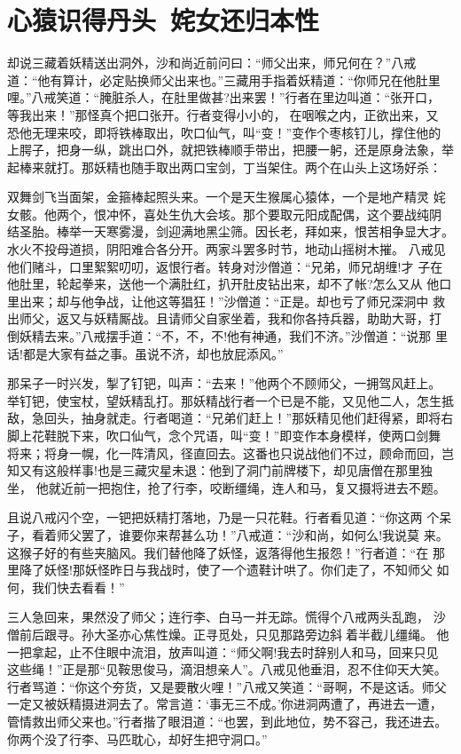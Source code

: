 \chapter{心猿识得丹头~姹女还归本性}

却说三藏着妖精送出洞外，沙和尚近前问曰：“师父出来，师兄何在？”八戒
道：“他有算计，必定贴换师父出来也。”三藏用手指着妖精道：“你师兄在他肚里
哩。”八戒笑道：“腌脏杀人，在肚里做甚?出来罢！”行者在里边叫道：“张开口，
等我出来！”那怪真个把口张开。行者变得小小的，在咽喉之内，正欲出来，又
恐他无理来咬，即将铁棒取出，吹口仙气，叫“变！”变作个枣核钉儿，撑住他的
上腭子，把身一纵，跳出口外，就把铁棒顺手带出，把腰一躬，还是原身法象，举
起棒来就打。那妖精也随手取出两口宝剑，丁当架住。两个在山头上这场好杀：

双舞剑飞当面架，金箍棒起照头来。一个是天生猴属心猿体，一个是地产精灵
姹女骸。他两个，恨冲怀，喜处生仇大会垓。那个要取元阳成配偶，这个要战纯阴
结圣胎。棒举一天寒雾漫，剑迎满地黑尘筛。因长老，拜如来，恨苦相争显大才。
水火不投母道损，阴阳难合各分开。两家斗罢多时节，地动山摇树木摧。
八戒见他们赌斗，口里絮絮叨叨，返恨行者。转身对沙僧道：“兄弟，师兄胡缠!才
子在他肚里，轮起拳来，送他一个满肚红，扒开肚皮钻出来，却不了帐?怎么又从
他口里出来；却与他争战，让他这等猖狂！”沙僧道：“正是。却也亏了师兄深洞中
救出师父，返又与妖精厮战。且请师父自家坐着，我和你各持兵器，助助大哥，打
倒妖精去来。”八戒摆手道：“不，不，不!他有神通，我们不济。”沙僧道：“说那
里话!都是大家有益之事。虽说不济，却也放屁添风。”

那呆子一时兴发，掣了钉钯，叫声：“去来！”他两个不顾师父，一拥驾风赶上。
举钉钯，使宝杖，望妖精乱打。那妖精战行者一个已是不能，又见他二人，怎生抵
敌，急回头，抽身就走。行者喝道：“兄弟们赶上！”那妖精见他们赶得紧，即将右
脚上花鞋脱下来，吹口仙气，念个咒语，叫“变！”即变作本身模样，使两口剑舞
将来；将身一幌，化一阵清风，径直回去。这番也只说战他们不过，顾命而回，岂
知又有这般样事!也是三藏灾星未退：他到了洞门前牌楼下，却见唐僧在那里独坐，
他就近前一把抱住，抢了行李，咬断缰绳，连人和马，复又摄将进去不题。

且说八戒闪个空，一钯把妖精打落地，乃是一只花鞋。行者看见道：“你这两
个呆子，看着师父罢了，谁要你来帮甚么功！”八戒道：“沙和尚，如何么!我说莫
来。这猴子好的有些夹脑风。我们替他降了妖怪，返落得他生报怨！”行者道：“在
那里降了妖怪!那妖怪昨日与我战时，使了一个遗鞋计哄了。你们走了，不知师父
如何，我们快去看看！”

三人急回来，果然没了师父；连行李、白马一并无踪。慌得个八戒两头乱跑，
沙僧前后跟寻。孙大圣亦心焦性燥。正寻觅处，只见那路旁边斜着半截儿缰绳。
他一把拿起，止不住眼中流泪，放声叫道：“师父啊!我去时辞别人和马，回来只见
这些绳！”正是那“见鞍思俊马，滴泪想亲人”。八戒见他垂泪，忍不住仰天大笑。
行者骂道：“你这个夯货，又是要散火哩！”八戒又笑道：“哥啊，不是这话。师父
一定又被妖精摄进洞去了。常言道：‘事无三不成。’你进洞两遭了，再进去一遭，
管情救出师父来也。”行者揩了眼泪道：“也罢，到此地位，势不容己，我还进去。
你两个没了行李、马匹耽心，却好生把守洞口。”


